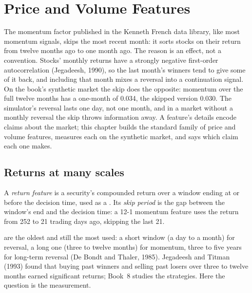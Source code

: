 \chapter{Price and Volume Features}\label{ch:rs:price-and-volume-features}

The momentum factor published in the Kenneth French data library, like most momentum signals, skips the most recent month: it
sorts stocks on their return from twelve months ago to one month ago. The reason is an effect, not a convention. Stocks' monthly returns have a strongly negative
first-order autocorrelation (Jegadeesh, 1990), so the last month's winners tend to give some of it back, and including that
month mixes a reversal into a continuation signal. On the book's synthetic market the skip does the opposite: momentum over
the full twelve months has a one-month  of 0.034, the skipped version 0.030. The simulator's reversal
lasts one day, not one month, and in a market without a monthly reversal the skip throws information away. A feature's
details encode claims about the market; this chapter builds the standard family of price and volume features, measures each
on the synthetic market, and says which claim each one makes.

\section{Returns at many scales}

\begin{definition}\label{def:rs:price-and-volume-features:return}
A \emph{return feature} is a security's compounded return over a window ending at or before the decision
time, used as a . Its \emph{skip period} is the gap between the window's end and the decision time:
a 12-1 momentum feature uses the return from 252 to 21 trading days ago, skipping the last 21.
\end{definition}

 are the oldest  and still the most used: a short window (a day to a month) for reversal, a long one
(three to twelve months) for momentum, three to five years for long-term reversal (De Bondt and Thaler, 1985). Jegadeesh and Titman
(1993) found that buying past winners and selling past losers over three to twelve months earned significant returns; Book~8
studies the strategies. Here the question is the measurement.

